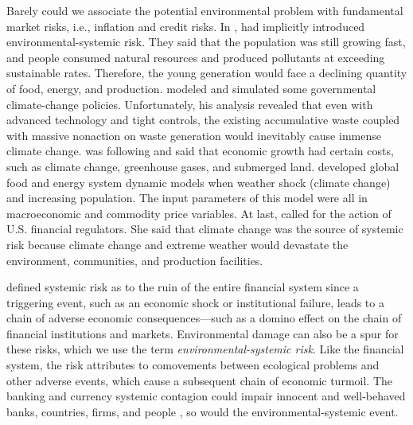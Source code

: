 \documentclass[sn-basic]{sn-jnl}%
\theoremstyle{thmstyleone}%
\theoremstyle{thmstyletwo}%
\theoremstyle{thmstylethree}%
\begin{document}
Barely could we associate the potential environmental problem with fundamental market risks, i.e., inflation and credit risks. In \citeyear{meadows1992beyond}, \citeauthor{meadows1992beyond} had implicitly introduced environmental-systemic risk. They said that the population was still growing fast, and people consumed natural resources and produced pollutants at exceeding sustainable rates. Therefore, the young generation would face a declining quantity of food, energy, and production. \citet{nordhaus1994managing} modeled and simulated some governmental climate-change policies. Unfortunately, his analysis revealed that even with advanced technology and tight controls, the existing accumulative waste coupled with massive nonaction on waste generation would inevitably cause immense climate change. \citet{daly2013further} was following and said that economic growth had certain costs, such as climate change, greenhouse gases, and submerged land. \citet{pasqualino2019integrated} developed global food and energy system dynamic models when weather shock (climate change) and increasing population. The input parameters of this model were all in macroeconomic and commodity price variables. At last, \citet{ramani2020addressing} called for the action of U.S. financial regulators. She said that climate change was the source of systemic risk because climate change and extreme weather would devastate the environment, communities, and production facilities.

\citet{schwarcz2008systemic} defined systemic risk as to the ruin of the entire financial system since a triggering event, such as an economic shock or institutional failure, leads to a chain of adverse economic consequences—such as a domino effect on the chain of financial institutions and markets. Environmental damage can also be a spur for these risks, which we use the term \emph{environmental-systemic risk}. Like the financial system, the risk attributes to comovements between ecological problems and other adverse events, which cause a subsequent chain of economic turmoil. The banking and currency systemic contagion could impair innocent and well-behaved banks, countries, firms, and people \citep{kaufman2000banking}, so would the environmental-systemic event. 
\end{document}
